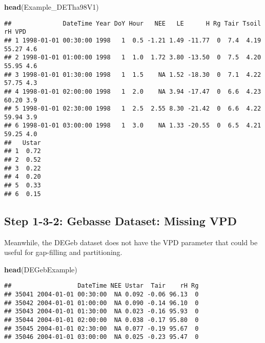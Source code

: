 \documentclass[
]{article}
\newenvironment{Shaded}{\begin{snugshade}}{\end{snugshade}}
\newcommand{\FunctionTok}[1]{\textcolor[rgb]{0.13,0.29,0.53}{\textbf{#1}}}
\newcommand{\NormalTok}[1]{#1}
\newcommand{\OtherTok}[1]{\textcolor[rgb]{0.56,0.35,0.01}{#1}}
\newcommand{\SpecialCharTok}[1]{\textcolor[rgb]{0.81,0.36,0.00}{\textbf{#1}}}
\begin{document}
\begin{Shaded}
\begin{Highlighting}[]
\FunctionTok{head}\NormalTok{(Example\_DETha98V1)}
\end{Highlighting}
\end{Shaded}

\begin{verbatim}
##              DateTime Year DoY Hour   NEE   LE      H Rg Tair Tsoil    rH VPD
## 1 1998-01-01 00:30:00 1998   1  0.5 -1.21 1.49 -11.77  0  7.4  4.19 55.27 4.6
## 2 1998-01-01 01:00:00 1998   1  1.0  1.72 3.80 -13.50  0  7.5  4.20 55.95 4.6
## 3 1998-01-01 01:30:00 1998   1  1.5    NA 1.52 -18.30  0  7.1  4.22 57.75 4.3
## 4 1998-01-01 02:00:00 1998   1  2.0    NA 3.94 -17.47  0  6.6  4.23 60.20 3.9
## 5 1998-01-01 02:30:00 1998   1  2.5  2.55 8.30 -21.42  0  6.6  4.22 59.94 3.9
## 6 1998-01-01 03:00:00 1998   1  3.0    NA 1.33 -20.55  0  6.5  4.21 59.25 4.0
##   Ustar
## 1  0.72
## 2  0.52
## 3  0.22
## 4  0.20
## 5  0.33
## 6  0.15
\end{verbatim}

\hypertarget{step-1-3-2-gebasse-dataset-missing-vpd}{%
\subsection{Step 1-3-2: Gebasse Dataset: Missing
VPD}\label{step-1-3-2-gebasse-dataset-missing-vpd}}

Meanwhile, the DEGeb dataset does not have the VPD parameter that could
be useful for gap-filling and partitioning.

\begin{Shaded}
\begin{Highlighting}[]
\FunctionTok{head}\NormalTok{(DEGebExample)}
\end{Highlighting}
\end{Shaded}

\begin{verbatim}
##                  DateTime NEE Ustar  Tair    rH Rg
## 35041 2004-01-01 00:30:00  NA 0.092 -0.06 96.13  0
## 35042 2004-01-01 01:00:00  NA 0.090 -0.14 96.10  0
## 35043 2004-01-01 01:30:00  NA 0.023 -0.16 95.93  0
## 35044 2004-01-01 02:00:00  NA 0.038 -0.17 95.80  0
## 35045 2004-01-01 02:30:00  NA 0.077 -0.19 95.67  0
## 35046 2004-01-01 03:00:00  NA 0.025 -0.23 95.47  0
\end{verbatim}

\begin{Shaded}
\end{Shaded}
\end{document}
